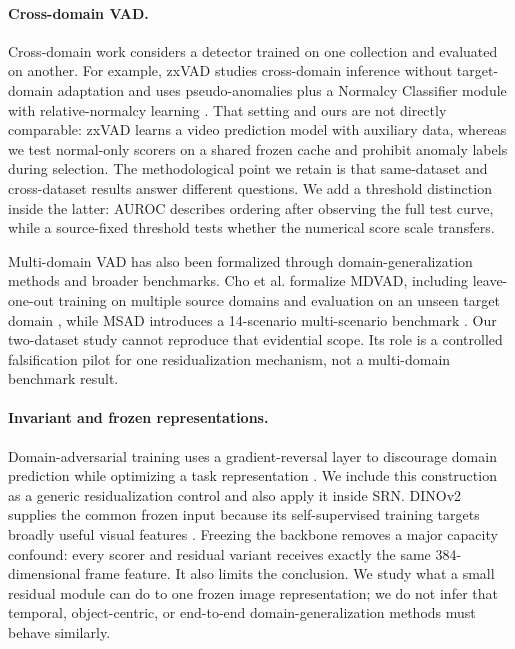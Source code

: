 \paragraph{Cross-domain VAD.}
Cross-domain work considers a detector trained on one collection and evaluated on another. For example, zxVAD studies cross-domain inference without target-domain adaptation and uses pseudo-anomalies plus a Normalcy Classifier module with relative-normalcy learning \citep{aich2023crossdomain}. That setting and ours are not directly comparable: zxVAD learns a video prediction model with auxiliary data, whereas we test normal-only scorers on a shared frozen cache and prohibit anomaly labels during selection. The methodological point we retain is that same-dataset and cross-dataset results answer different questions. We add a threshold distinction inside the latter: AUROC describes ordering after observing the full test curve, while a source-fixed threshold tests whether the numerical score scale transfers.

Multi-domain VAD has also been formalized through domain-generalization methods and broader benchmarks. Cho et al. formalize MDVAD, including leave-one-out training on multiple source domains and evaluation on an unseen target domain \citep{cho2024multidomain}, while MSAD introduces a 14-scenario multi-scenario benchmark \citep{zhu2024advancing}. Our two-dataset study cannot reproduce that evidential scope. Its role is a controlled falsification pilot for one residualization mechanism, not a multi-domain benchmark result.

\paragraph{Invariant and frozen representations.}
Domain-adversarial training uses a gradient-reversal layer to discourage domain prediction while optimizing a task representation \citep{ganin2016domain}. We include this construction as a generic residualization control and also apply it inside SRN. DINOv2 supplies the common frozen input because its self-supervised training targets broadly useful visual features \citep{oquab2024dinov2}. Freezing the backbone removes a major capacity confound: every scorer and residual variant receives exactly the same 384-dimensional frame feature. It also limits the conclusion. We study what a small residual module can do to one frozen image representation; we do not infer that temporal, object-centric, or end-to-end domain-generalization methods must behave similarly.

